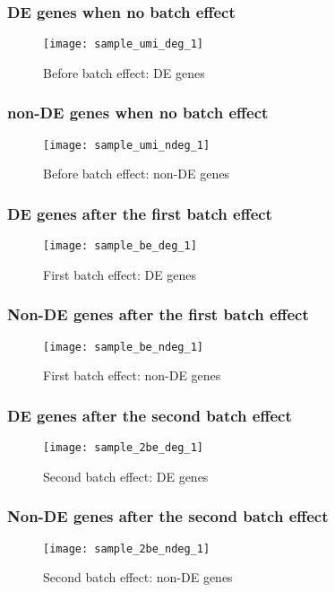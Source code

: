\begin{frame}
  \frametitle{DE genes when no batch effect}
  \begin{figure}
    \centering
    \texttt{[image: sample\_umi\_deg\_1]}
    \caption{Before batch effect: DE genes} 
  \end{figure}
\end{frame}

\begin{frame}
  \frametitle{non-DE genes when no batch effect}
  \begin{figure}
    \centering
    \texttt{[image: sample\_umi\_ndeg\_1]}
    \caption{Before batch effect: non-DE genes} 
  \end{figure}
\end{frame}

\begin{frame}
  \frametitle{DE genes after the first batch effect}
  \begin{figure}
    \centering
    \texttt{[image: sample\_be\_deg\_1]}
    \caption{First batch effect: DE genes} 
  \end{figure}
\end{frame}

\begin{frame}
  \frametitle{Non-DE genes after the first batch effect}
  \begin{figure}
    \centering
    \texttt{[image: sample\_be\_ndeg\_1]}
    \caption{First batch effect: non-DE genes} 
  \end{figure}
\end{frame}

\begin{frame}
  \frametitle{DE genes after the second batch effect}
  \begin{figure}
    \centering
    \texttt{[image: sample\_2be\_deg\_1]}
    \caption{Second batch effect: DE genes} 
  \end{figure}
\end{frame}

\begin{frame}
  \frametitle{Non-DE genes after the second batch effect}
  \begin{figure}
    \centering
    \texttt{[image: sample\_2be\_ndeg\_1]}
    \caption{Second batch effect: non-DE genes} 
  \end{figure}
\end{frame}

